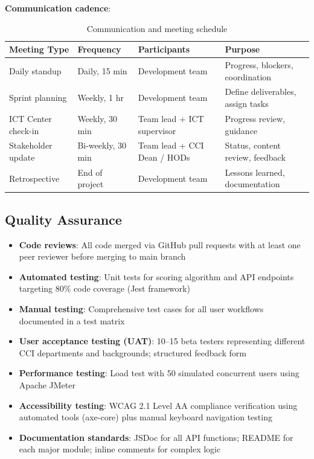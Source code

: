 ﻿\documentclass[12pt, a4paper]{article}
\newcommand{\theadrow}{\rowcolor{tableheader}}
\newcommand{\rowalt}{\rowcolor{tablerowalt}}
\begin{document}
\textbf{Communication cadence}:
\begin{table}[H]
\centering
\begin{tabularx}{\textwidth}{p{3cm}p{2.5cm}Xp{2.5cm}}
\toprule
\theadrow
\textbf{Meeting Type} & \textbf{Frequency} & \textbf{Participants} & \textbf{Purpose} \\
\midrule
Daily standup        & Daily, 15 min       & Development team                  & Progress, blockers, coordination \\[3pt]
\rowalt
Sprint planning      & Weekly, 1 hr        & Development team                  & Define deliverables, assign tasks \\[3pt]
ICT Center check-in  & Weekly, 30 min      & Team lead + ICT supervisor        & Progress review, guidance \\[3pt]
\rowalt
Stakeholder update   & Bi-weekly, 30 min   & Team lead + CCI Dean / HODs       & Status, content review, feedback \\[3pt]
Retrospective        & End of project      & Development team                  & Lessons learned, documentation \\
\bottomrule
\end{tabularx}
\caption{Communication and meeting schedule}
\end{table}

\subsection{Quality Assurance}

\begin{itemize}[leftmargin=1.5em, itemsep=3pt]
    \item \textbf{Code reviews}: All code merged via GitHub pull requests with at least one peer reviewer before merging to main branch
    \item \textbf{Automated testing}: Unit tests for scoring algorithm and API endpoints targeting 80\% code coverage (Jest framework)
    \item \textbf{Manual testing}: Comprehensive test cases for all user workflows documented in a test matrix
    \item \textbf{User acceptance testing (UAT)}: 10--15 beta testers representing different CCI departments and backgrounds; structured feedback form
    \item \textbf{Performance testing}: Load test with 50 simulated concurrent users using Apache JMeter
    \item \textbf{Accessibility testing}: WCAG 2.1 Level AA compliance verification using automated tools (axe-core) plus manual keyboard navigation testing
    \item \textbf{Documentation standards}: JSDoc for all API functions; README for each major module; inline comments for complex logic
\end{itemize}
\end{document}
